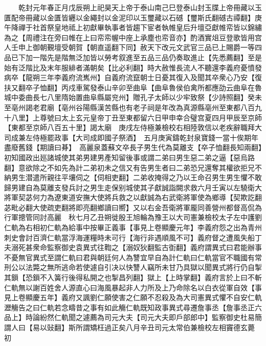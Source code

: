 　　乾封元年春正月戊辰朔上祀昊天上帝于泰山南己巳登泰山封玉牒上帝冊藏以玉匱配帝冊藏以金匱皆纒以金繩封以金泥印以玉璽藏以石䃭【璽斯氏翻䃭古禫翻】庚午降禪于社首祭皇地祗上初獻畢執事者皆趨下宦者執帷皇后升壇亞獻帷帟皆以錦繡為之【周禮注在旁曰帷在上曰帟帟幄中座上承塵也帟音亦】酌酒實俎豆登歌皆用宫人壬申上御朝覲壇受朝賀【朝直遥翻下同】赦天下改元文武官三品已上賜爵一等四品已下加一階先是階無泛加皆以勞考叙進至五品三品仍奏取進止【先悉薦翻】至是始有泛階比及末年服緋者滿朝矣【比必利翻】時大赦惟長流人不聽還李義府憂憤發病卒【龍朔三年李義府流嶲州】自義府流竄朝士日憂其復入及聞其卒衆心乃安【復扶又翻卒子恤翻】丙戍車駕發泰山辛卯至曲阜【曲阜魯侯伯禽所都應劭云曲阜在魯城中委曲長七八里隋始置曲阜縣屬兖州】贈孔子太師以少牢致祭【少詩照翻】癸未至亳州謁老君廟【亳州谷陽縣漢苦縣也有老子祠是年改為真源縣亳州至東都八百九十八里】上尊號曰太上玄元皇帝丁丑至東都留六日甲申幸合璧宫夏四月甲辰至京師【東都至京師八百五十里】謁太廟　庚戌左侍極兼檢校右相陸敦信以老疾辭職拜大司成兼左侍極罷政事【大司成即國子祭酒】　五月庚寅鑄乾封泉寶錢一當十俟期年盡廢舊錢【期讀曰朞】　高麗泉蓋蘇文卒長子男生代為莫離支【卒子恤翻長知兩翻】初知國政出廵諸城使其弟男建男產知留後事或謂二弟曰男生惡二弟之逼【惡烏路翻】意欲除之不如先為計二弟初未之信又有告男生者曰二弟恐兄還奪其權欲拒兄不納男生潜遣所親往平壤伺之【伺相吏翻】二弟收掩得之乃以王命召男生男生懼不敢歸男建自為莫離支發兵討之男生走保别城使其子獻誠詣闕求救六月壬寅以左驍衛大將軍契苾何力為遼東道安撫大使將兵救之以獻誠為右武衛將軍使為鄉導【契欺訖翻苾毗必翻大使疏吏翻將即亮翻鄉讀曰嚮】又以右金吾衛將軍龎同善營州都督高侃為行軍摠管同討高麗　秋七月乙丑朔徙殷王旭輪為豫王以大司憲兼檢校太子左中護劉仁軌為右相初仁軌為給事中按畢正義事【事見上卷顯慶元年】李義府怨之出為青州刺史會討百濟仁軌當浮海運糧時未可行【海行非遇順風不可】義府督之遭風失船丁夫溺死甚衆命監察御史袁異式往鞫之【溺奴狄翻監古衘翻】義府謂異式曰君能辦事不憂無官異式至謂仁軌曰君與朝廷何人為讐宜早自為計仁軌曰仁軌當官不職國有常刑公以法斃之無所逃命若使遽自引决以快讐人竊所未甘乃具獄以聞異式將行仍自掣其鎻【恐鎻不入簧行後得私開之也掣昌列翻】獄上【上時掌翻】義府言於上曰不斬仁軌無以謝百姓舍人源直心曰海風暴起非人力所及上乃命除名以白衣從軍自效【事見上卷顯慶五年】義府又諷劉仁願使害之仁願不忍殺及為大司憲異式懼不自安仁軌瀝觴告之曰仁軌若念疇昔之事有如此觴仁軌既知政事異式尋遷詹事丞【詹事丞正六品上】時論紛然仁軌聞之遽薦為司元大夫【司元大夫即戶部郎中】監察御史杜易簡謂人曰【易以䜴翻】斯所謂矯枉過正矣八月辛丑司元太常伯兼檢校左相竇德玄薨　初

